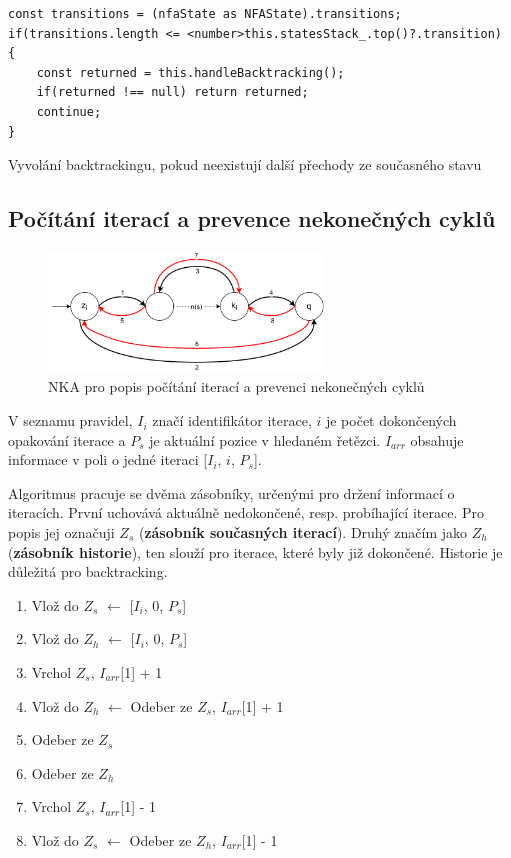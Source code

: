 \begin{code}[!ht]
	\begin{verbatim}
const transitions = (nfaState as NFAState).transitions;
if(transitions.length <= <number>this.statesStack_.top()?.transition)
{
	const returned = this.handleBacktracking();
	if(returned !== null) return returned;
	continue;
}
	\end{verbatim}
	\caption{Vyvolání backtrackingu, pokud neexistují další přechody ze současného stavu}
	\label{code:matching2}
\end{code}

\newpage

\subsection*{Počítání iterací a prevence nekonečných cyklů}

\begin{figure}[!h]
	\centering
	\includegraphics[width=0.65\textwidth]{Figures/IterationCount.pdf}
	\caption{NKA pro popis počítání iterací a prevenci nekonečných cyklů}
	\label{fig:ITERCNT}
\end{figure}

V seznamu pravidel, $I_i$ značí identifikátor iterace, $i$ je počet dokončených opakování iterace a $P_s$ je aktuální pozice v hledaném řetězci.
$I_{arr}$ obsahuje informace v poli o jedné iteraci [$I_i$, $i$, $P_s$].

Algoritmus pracuje se dvěma zásobníky, určenými pro držení informací o iteracích. 
První uchovává aktuálně nedokončené, resp. probíhající iterace. 
Pro popis jej označuji $Z_s$ (\textbf{zásobník současných iterací}).
Druhý značím jako $Z_h$ (\textbf{zásobník historie}), ten slouží pro iterace, které byly již dokončené.
Historie je důležitá pro backtracking.

\begin{enumerate}[label=\arabic* --]
	\item Vlož do $Z_s$ $\longleftarrow$ [$I_i$, 0, $P_s$]
	\item Vlož do $Z_h$ $\longleftarrow$ [$I_i$, 0, $P_s$]
	\item Vrchol $Z_s$, $I_{arr}$[1] + 1
	\item Vlož do $Z_h$ $\longleftarrow$ Odeber ze $Z_s$, $I_{arr}$[1] + 1
	\item Odeber ze $Z_s$
	\item Odeber ze $Z_h$
	\item Vrchol $Z_s$, $I_{arr}$[1] - 1
	\item Vlož do $Z_s$ $\longleftarrow$ Odeber ze $Z_h$, $I_{arr}$[1] - 1
\end{enumerate}

